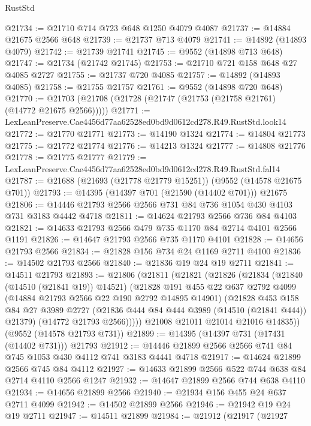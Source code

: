 \begin{lexlean}{RustStd}
\begin{coremodule}
@21734 := @21710 @714 @723 @648 @1250 @4079 @4087
@21737 := @14884 @21675 @2566 @648
@21739 := @21737 @713 @4079
@21741 := @14892 (@14893 @4079)
@21742 := @21739 @21741
@21745 := @9552 (@14898 @713 @648)
@21747 := @21734 (@21742 @21745)
@21753 := @21710 @721 @158 @648 @27 @4085 @2727
@21755 := @21737 @720 @4085
@21757 := @14892 (@14893 @4085)
@21758 := @21755 @21757
@21761 := @9552 (@14898 @720 @648)
@21770 := @21703 (@21708 (@21728 (@21747 (@21753 (@21758 @21761) (@14772 @21675 @2566)))))
@21771 := LexLeanPreserve.Cae4456d77aa62528ed0bd9d0612cd278.R49.RustStd.look14
@21772 := @21770 @21771
@21773 := @14190 @1324
@21774 := @14804 @21773
@21775 := @21772 @21774
@21776 := @14213 @1324
@21777 := @14808 @21776
@21778 := @21775 @21777
@21779 := LexLeanPreserve.Cae4456d77aa62528ed0bd9d0612cd278.R49.RustStd.fal14
@21787 := @21688 (@21693 (@21778 @21779 @15251)) (@9552 (@14578 @21675 @701))
@21793 := @14395 (@14397 @701 (@21590 (@14402 @701))) @21675
@21806 := @14446 @21793 @2566 @2566 @731 @84 @736 @1054 @430 @4103 @731 @3183 @4442 @4718
@21811 := @14624 @21793 @2566 @736 @84 @4103
@21821 := @14633 @21793 @2566 @479 @735 @1170 @84 @2714 @4101 @2566 @1191
@21826 := @14647 @21793 @2566 @735 @1170 @4101
@21828 := @14656 @21793 @2566
@21834 := @21828 @156 @734 @24 @1169 @2711 @4100
@21836 := @14502 @21793 @2566
@21840 := @21836 @19 @24 @19 @2711
@21841 := @14511 @21793
@21893 := @21806
    (@21811
      (@21821
        (@21826
          (@21834
            (@21840 (@14510 (@21841 @19)) @14521)
            (@21828
              @191
              @455
              @22
              @637
              @2792
              @4099
              (@14884 @21793 @2566 @22 @190 @2792 @14895 @14901)
              (@21828
                @453
                @158
                @84
                @27
                @3989
                @2727
                (@21836 @444 @84 @444 @3989 (@14510 (@21841 @444)) @21379)
                (@14772 @21793 @2566)))))
        @21008
        @21011
        @21014
        @21016
        @14835))
    (@9552 (@14578 @21793 @731))
@21899 := @14395 (@14397 @731 (@17431 (@14402 @731))) @21793
@21912 := @14446 @21899 @2566 @2566 @741 @84 @745 @1053 @430 @4112 @741 @3183 @4441 @4718
@21917 := @14624 @21899 @2566 @745 @84 @4112
@21927 := @14633 @21899 @2566 @522 @744 @638 @84 @2714 @4110 @2566 @1247
@21932 := @14647 @21899 @2566 @744 @638 @4110
@21934 := @14656 @21899 @2566
@21940 := @21934 @156 @455 @24 @637 @2711 @4099
@21942 := @14502 @21899 @2566
@21946 := @21942 @19 @24 @19 @2711
@21947 := @14511 @21899
@21984 := @21912
    (@21917
      (@21927

\end{coremodule}
\end{lexlean}
